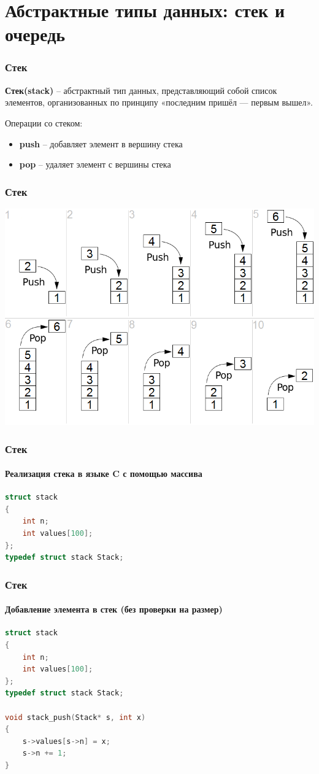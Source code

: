 \documentclass[12pt,pdf,hyperref={unicode}]{beamer}
\begin{document}


\section{Абстрактные типы данных: стек и очередь}

\begin{frame}[fragile]
\frametitle{Стек} 
\textbf{Стек(stack)} -- абстрактный тип данных, представляющий собой список элементов, организованных по принципу «последним пришёл — первым вышел». 

Операции со стеком:
\begin{itemize}
\item \textbf{push} -- добавляет элемент в вершину стека
\item \textbf{pop} -- удаляет элемент с вершины стека
\end{itemize}
\end{frame}


\begin{frame}[fragile]
\frametitle{Стек} 
\begin{center}
\includegraphics[width=0.8\linewidth]{images/Lifo_stack.png}
\end{center}
\end{frame}


\begin{frame}[fragile]
\frametitle{Стек} 
\framesubtitle{Реализация стека в языке C с помощью массива} 

\begin{lstlisting}[language=C++,basicstyle=\ttfamily,keywordstyle=\color{blue}]
struct stack 
{
    int n;
    int values[100];
};
typedef struct stack Stack;
\end{lstlisting}
\end{frame}


\begin{frame}[fragile]
\frametitle{Стек} 
\framesubtitle{Добавление элемента в стек (без проверки на размер)} 
\begin{lstlisting}[language=C++,basicstyle=\ttfamily,keywordstyle=\color{blue}]
struct stack 
{
    int n;
    int values[100];
};
typedef struct stack Stack;

void stack_push(Stack* s, int x)
{
    s->values[s->n] = x;
    s->n += 1;
}
\end{lstlisting}
\end{frame}
\end{document}
